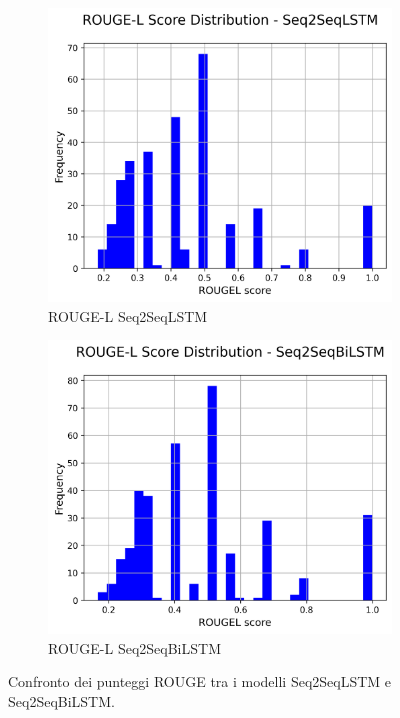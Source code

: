 \documentclass[a4paper, 12pt]{article}
\begin{document}
\begin{figure}[H]
    \begin{subfigure}{0.32\textwidth}
        \centering
        \includegraphics[width=\textwidth]{media/Seq2SeqLSTM_rougeL_scores.png}
        \caption{ROUGE-L Seq2SeqLSTM}
    \end{subfigure}
    \hfill
    \begin{subfigure}{0.32\textwidth}
        \centering
        \includegraphics[width=\textwidth]{media/Seq2SeqBiLSTM_rougeL_scores.png}
        \caption{ROUGE-L Seq2SeqBiLSTM}
    \end{subfigure}
    \caption{Confronto dei punteggi ROUGE tra i modelli Seq2SeqLSTM e Seq2SeqBiLSTM.}
    \label{fig:rouge_comparison}
\end{figure}
\end{document}
